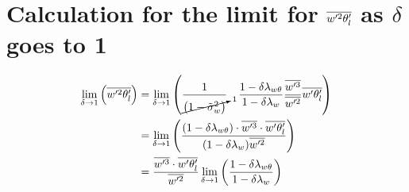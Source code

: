 \section{Calculation for the limit for \texorpdfstring{$\overline{w'^2 \theta_l'}$}{wprime2thetalprimebar} as \texorpdfstring{$\delta$}{delta} goes to 1}
\label{sec:calculation-for-the-limit-for-wprime2thetalprimebar-as-delta-goes-to-1}

\begin{align}
    \label{eq:limit_wprime2thetalbar_delta_to_1_calc}
    \lim_{\delta \to 1}\left(\overline{w'^2 \theta_l'}\right)
    &= \lim_{\delta \to 1}\left(
    \frac{1}{\cancelto{1}{\left( 1 - \tilde{\sigma}_w^2 \right)}}
    \quad
    \frac{1 - \delta \lambda_{w\theta}}{1-\delta \lambda_w}
    \frac{\overline{w'^3}}{\overline{w'^2}} \overline{w'\theta_l'}
    \right)
    \\
    &= \lim_{\delta \to 1}\left(
    \frac{(1 - \delta \lambda_{w\theta}) \cdot \overline{w'^3} \cdot \overline{w'\theta_l'}}
    {(1-\delta \lambda_w)\overline{w'^2}}
    \right)
    \\
    &= \frac{\overline{w'^3} \cdot \overline{w'\theta_l'}}{\overline{w'^2}}
    \lim_{\delta \to 1}
    \left(\frac{1 - \delta \lambda_{w\theta}}{1-\delta \lambda_w}\right)
\end{align}